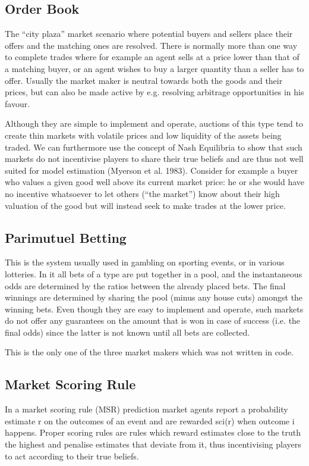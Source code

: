 \documentclass[bsc,frontabs,twoside,singlespacing,parskip,deptreport]{infthesis}     %
\begin{document}
\subsection{Order Book}
    
    The “city plaza” market scenario where potential buyers and sellers place their offers and the matching ones are resolved. There is normally more than one way to complete trades where for example an agent sells at a price lower than that of a matching buyer, or an agent wishes to buy a larger quantity than a seller has to offer. Usually the market maker is neutral towards both the goods and their prices, but can also be made active by e.g. resolving arbitrage opportunities in his favour.

    Although they are simple to implement and operate, auctions of this type tend to create thin markets with volatile prices and low liquidity of the assets being traded. We can furthermore use the concept of Nash Equilibria to show that such markets do not incentivise players to share their true beliefs and are thus not well suited for model estimation (Myerson et al. 1983). Consider for example a buyer who values a given good well above its current market price: he or she would have no incentive whatsoever to let others (“the market”) know about their high valuation of the good but will instead seek to make trades at the lower price.
    
\subsection{Parimutuel Betting}
This is the system usually used in gambling on sporting events, or in various lotteries. In it all bets of a type are put together in a pool, and the instantaneous odds are determined by the ratios between the already placed bets. The final winnings are determined by sharing the pool (minus any house cuts) amongst the winning bets. Even though they are easy to implement and operate, such markets do not offer any guarantees on the amount that is won in case of success (i.e. the final odds) since the latter is not known until all bets are collected.

This is the only one of the three market makers which was not written in code. 

\subsection{Market Scoring Rule}
In a market scoring rule (MSR) prediction market agents report a probability estimate r on the outcomes of an event and are rewarded sci(r) when outcome i happens. Proper scoring rules are rules which reward estimates close to the truth the highest and penalise estimates that deviate from it, thus incentivising players to act according to their true beliefs.
\end{document}
